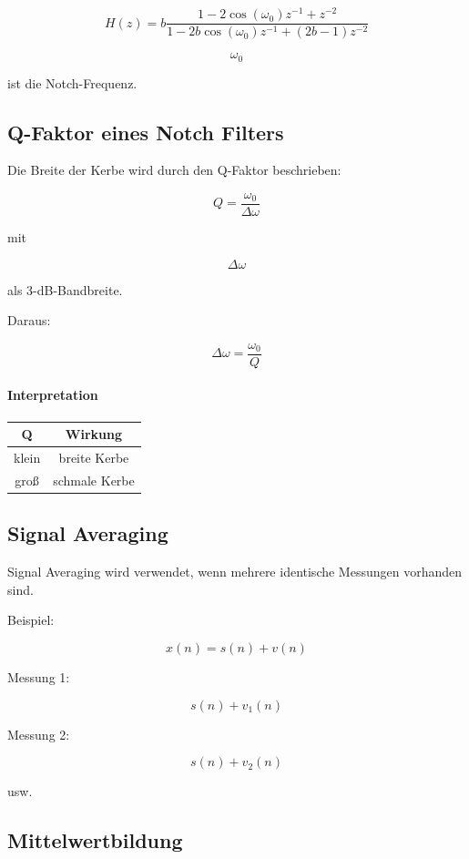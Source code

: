 \[
H(z)=
b
\frac{
1-2\cos(\omega_0)z^{-1}+z^{-2}
}
{
1-2b\cos(\omega_0)z^{-1}
+
(2b-1)z^{-2}
}
\]

\[
\omega_0
\]

ist die Notch-Frequenz.

\subsection{Q-Faktor eines Notch Filters}

Die Breite der Kerbe wird durch den Q-Faktor beschrieben:

\[
Q=
\frac{\omega_0}
{\Delta\omega}
\]

mit

\[
\Delta\omega
\]

als 3-dB-Bandbreite.

Daraus:

\[
\Delta\omega=
\frac{\omega_0}{Q}
\]

\paragraph{Interpretation}

\begin{table}[h]
\centering
\begin{tabular}{c|c}
Q & Wirkung \\
\hline
klein & breite Kerbe \\
groß & schmale Kerbe \\
\end{tabular}
\end{table}

\subsection{Signal Averaging}

Signal Averaging wird verwendet, wenn mehrere identische Messungen vorhanden sind.

Beispiel:

\[
x(n)=s(n)+v(n)
\]

Messung 1:

\[
s(n)+v_1(n)
\]

Messung 2:

\[
s(n)+v_2(n)
\]

usw.

\subsection{Mittelwertbildung}


